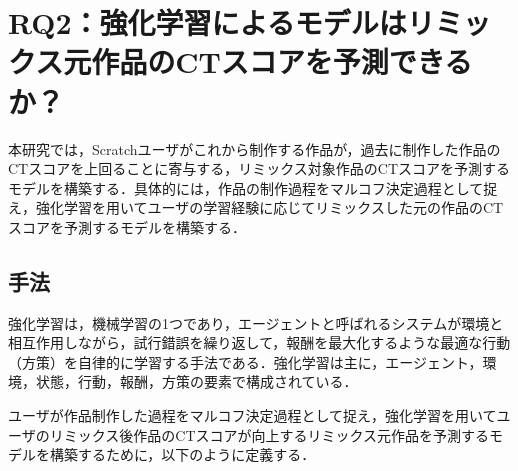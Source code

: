 \documentclass[submit,techrep,noauthor]{ipsj}
\newcommand{\todo}[1]{\colorbox{yellow}{{\bf TODO}:}{\color{red} {\textbf{[#1]}}}}
\newcommand{\ihara}[1]{\colorbox{green}{{\bf IHARA}:}{\color{blue} {\textbf{[#1]}}}}
\begin{document}



\section{RQ2：強化学習によるモデルはリミックス元作品のCTスコアを予測できるか？}
\label{sec:rq2}

本研究では，Scratchユーザがこれから制作する作品が，過去に制作した作品のCTスコアを上回ることに寄与する，リミックス対象作品のCTスコアを予測するモデルを構築する．具体的には，作品の制作過程をマルコフ決定過程として捉え，強化学習を用いてユーザの学習経験に応じてリミックスした元の作品のCTスコアを予測するモデルを構築する．

\subsection{手法}
強化学習は，機械学習の1つであり，エージェントと呼ばれるシステムが環境と相互作用しながら，試行錯誤を繰り返して，報酬を最大化するような最適な行動（方策）を自律的に学習する手法である．強化学習は主に，エージェント，環境，状態，行動，報酬，方策の要素で構成されている．

ユーザが作品制作した過程をマルコフ決定過程として捉え，強化学習を用いてユーザのリミックス後作品のCTスコアが向上するリミックス元作品を予測するモデルを構築するために，以下のように定義する．
\end{document}
